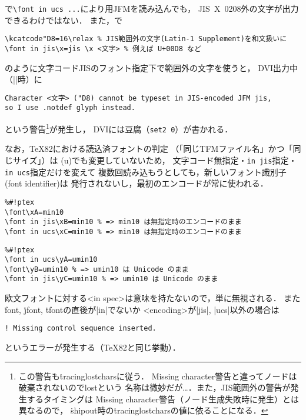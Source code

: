 \documentclass[a4paper,11pt,nomag,dvipdfmx]{jsarticle}
\begin{document}
\begin{dangerous}
  \pTeX で\verb|\font in ucs ...|により\upTeX 用JFMを読み込んでも，
  JIS~X~0208外の文字が出力できるわけではない．
  また，\upTeX で
\begin{verbatim}
\kcatcode"D8=16\relax % JIS範囲外の文字(Latin-1 Supplement)を和文扱いに
\font in jis\x=jis \x <文字> % 例えば U+00D8 など
\end{verbatim}
  のように文字コードJISのフォント指定下で範囲外の文字を使うと，
  DVI出力中（|\shipout|時）に
\begin{verbatim}
Character <文字> ("D8) cannot be typeset in JIS-encoded JFM jis,
so I use .notdef glyph instead.
\end{verbatim}
  という警告\footnote{この警告も\.{tracinglostchars}に従う．
  Missing character警告と違ってノードは破棄されないのでlostという
  名称は微妙だが…．また，JIS範囲外の警告が発生するタイミングは
  Missing character警告（ノード生成失敗時に発生）とは異なるので，
  \.{shipout}時の\.{tracinglostchars}の値に依ることになる．}が発生し，
  DVIには豆腐（\verb+set2 0+）が書かれる．
\end{dangerous}

\begin{dangerous}
  なお，\TeX82における読込済フォントの判定
  （「同じTFMファイル名」かつ「同じサイズ」）は
  (u)\pTeX でも変更していないため，
  文字コード無指定・\verb+in jis+指定・\verb+in ucs+指定だけを変えて
  複数回読み込もうとしても，新しいフォント識別子(font identifier)は
  発行されないし，最初のエンコードが常に使われる．
\begin{verbatim}
%#!ptex
\font\xA=min10
\font in jis\xB=min10 % => min10 は無指定時のエンコードのまま
\font in ucs\xC=min10 % => min10 は無指定時のエンコードのまま
\end{verbatim}
\begin{verbatim}
%#!ptex
\font in ucs\yA=umin10
\font\yB=umin10 % => umin10 は Unicode のまま
\font in jis\yC=umin10 % => umin10 は Unicode のまま
\end{verbatim}
\end{dangerous}

\begin{dangerous}
  欧文フォントに対する<in spec>は意味を持たないので，単に無視される．
  また\.{font}, \.{jfont}, \.{tfont}の直後が|in|でないか
  <encoding>が|jis|, |ucs|以外の場合は
\begin{verbatim}
! Missing control sequence inserted.
\end{verbatim}
  というエラーが発生する（\TeX82と同じ挙動）．
\end{dangerous}
%
\fi
\end{document}
